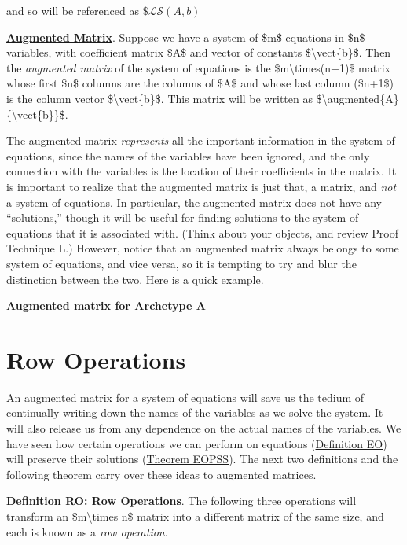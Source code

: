 \documentclass[openany]{book}
\begin{document}
and so will be referenced as \(\$\mathcal L \mathcal S({A}, b)\)

\protect\hyperlink{definition-am-augmented-matrix}{\textbf{Augmented
Matrix}}. Suppose we have a system of \$m\$ equations in \$n\$
variables, with coefficient matrix \$A\$ and vector of constants
\$\textbackslash{}vect\{b\}\$. Then the \emph{augmented matrix} of the
system of equations is the \$m\textbackslash{}times(n+1)\$ matrix whose
first \$n\$ columns are the columns of \$A\$ and whose last column
(\$n+1\$) is the column vector \$\textbackslash{}vect\{b\}\$. This
matrix will be written as
\$\textbackslash{}augmented\{A\}\{\textbackslash{}vect\{b\}\}\$.

The augmented matrix \emph{represents} all the important information in
the system of equations, since the names of the variables have been
ignored, and the only connection with the variables is the location of
their coefficients in the matrix. It is important to realize that the
augmented matrix is just that, a matrix, and \emph{not} a system of
equations. In particular, the augmented matrix does not have any
``solutions,'' though it will be useful for finding solutions to the
system of equations that it is associated with. (Think about your
objects, and review {Proof Technique L}.) However, notice that an
augmented matrix always belongs to some system of equations, and vice
versa, so it is tempting to try and blur the distinction between the
two. Here is a quick example.

\protect\hyperlink{example-amaa-augmented-matrix-for-archetype-a}{\textbf{Augmented
matrix for Archetype A}}

\section{Row Operations}\label{row-operations}

An augmented matrix for a system of equations will save us the tedium of
continually writing down the names of the variables as we solve the
system. It will also release us from any dependence on the actual names
of the variables. We have seen how certain operations we can perform on
equations
(\href{http://linear.ups.edu/html/section-RREF.html}{Definition EO})
will preserve their solutions
(\href{http://linear.ups.edu/html/section-RREF.html}{Theorem EOPSS}).
The next two definitions and the following theorem carry over these
ideas to augmented matrices.

\protect\hyperlink{definition-ro-row-operations}{\textbf{Definition RO:
Row Operations}}. The following three operations will transform an
\$m\textbackslash{}times n\$ matrix into a different matrix of the same
size, and each is known as a \emph{row operation}.
\end{document}
